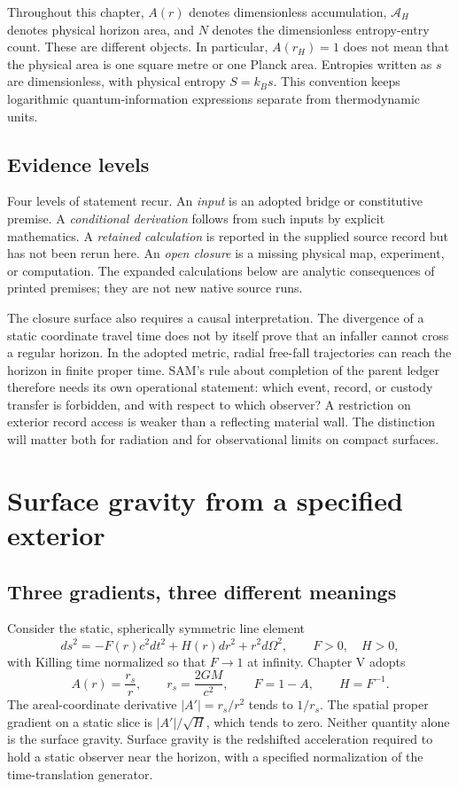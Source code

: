 Throughout this chapter, $A(r)$ denotes dimensionless accumulation, $\mathcal A_H$ denotes physical horizon area, and $N$ denotes the dimensionless entropy-entry count. These are different objects. In particular, $A(r_H)=1$ does not mean that the physical area is one square metre or one Planck area. Entropies written as $s$ are dimensionless, with physical entropy $S=k_Bs$. This convention keeps logarithmic quantum-information expressions separate from thermodynamic units.

\subsection{Evidence levels}
Four levels of statement recur. An \emph{input} is an adopted bridge or constitutive premise. A \emph{conditional derivation} follows from such inputs by explicit mathematics. A \emph{retained calculation} is reported in the supplied source record but has not been rerun here. An \emph{open closure} is a missing physical map, experiment, or computation. The expanded calculations below are analytic consequences of printed premises; they are not new native source runs.

The closure surface also requires a causal interpretation. The divergence of a static coordinate travel time does not by itself prove that an infaller cannot cross a regular horizon. In the adopted metric, radial free-fall trajectories can reach the horizon in finite proper time. SAM's rule about completion of the parent ledger therefore needs its own operational statement: which event, record, or custody transfer is forbidden, and with respect to which observer? A restriction on exterior record access is weaker than a reflecting material wall. The distinction will matter both for radiation and for observational limits on compact surfaces.

\section{Surface gravity from a specified exterior}
\subsection{Three gradients, three different meanings}
Consider the static, spherically symmetric line element
\begin{equation}
 ds^2=-F(r)c^2dt^2+H(r)dr^2+r^2d\Omega^2,
 \qquad F>0,\quad H>0,
 \label{c7:metric}
\end{equation}
with Killing time normalized so that $F\to1$ at infinity. Chapter V adopts
\begin{equation}
 A(r)=\frac{r_s}{r},\qquad r_s=\frac{2GM}{c^2},\qquad
 F=1-A,\qquad H=F^{-1}.
 \label{c7:adapter}
\end{equation}
The areal-coordinate derivative $|A'|=r_s/r^2$ tends to $1/r_s$. The spatial proper gradient on a static slice is $|A'|/\sqrt H$, which tends to zero. Neither quantity alone is the surface gravity. Surface gravity is the redshifted acceleration required to hold a static observer near the horizon, with a specified normalization of the time-translation generator.

